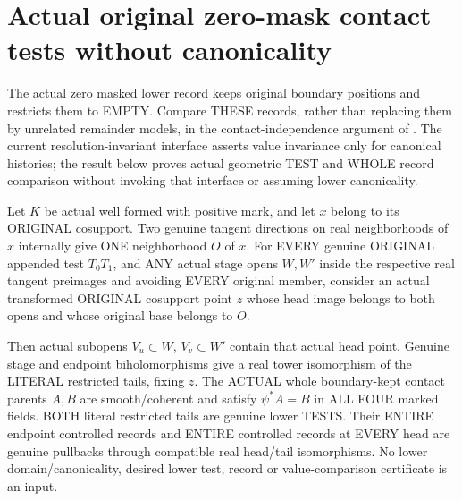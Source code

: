 \section{Actual original zero-mask contact tests without canonicality}

The actual zero masked lower record keeps original boundary positions and
restricts them to EMPTY. Compare THESE records, rather than replacing them
by unrelated remainder models, in the contact-independence argument of
\cite[Sections~5 and~7]{bierstone-milman08-functoriality}. The current
resolution-invariant interface asserts value invariance only for canonical
histories; the result below proves actual geometric TEST and WHOLE record
comparison without invoking that interface or assuming lower canonicality.

\begin{theorem}
\label{hir:original-any-test-zero-mask-choice-actual-lower-towers}
\leanok
Let $K$ be actual well formed with positive mark, and let $x$ belong to its
ORIGINAL cosupport. Two genuine tangent directions on real neighborhoods
of $x$ internally give ONE neighborhood $O$ of $x$. For EVERY genuine
ORIGINAL appended test $T_0T_1$, and ANY actual stage opens $W,W'$ inside
the respective real tangent preimages and avoiding EVERY original member,
consider an actual transformed ORIGINAL cosupport point $z$ whose head
image belongs to both opens and whose original base belongs to $O$.

Then actual subopens $V_u\subset W$, $V_v\subset W'$ contain that actual
head point. Genuine stage and endpoint biholomorphisms give a real tower
isomorphism of the LITERAL restricted tails, fixing $z$. The ACTUAL whole
boundary-kept contact parents $A,B$ are smooth/coherent and satisfy
$\psi^*A=B$ in ALL FOUR marked fields. BOTH literal restricted tails are
genuine lower TESTS. Their ENTIRE endpoint controlled records and ENTIRE
controlled records at EVERY head are genuine pullbacks through compatible
real head/tail isomorphisms. No lower domain/canonicality, desired lower
test, record or value-comparison certificate is an input.
\end{theorem}
